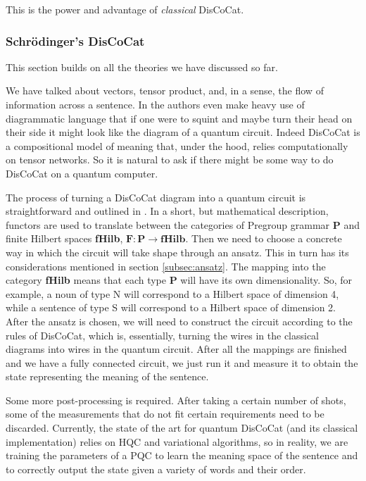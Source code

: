 This is the power and advantage of \textit{classical} DisCoCat.

\subsubsection{Schr{\"o}dinger's DisCoCat}
This section builds on all the theories we have discussed so far.

We have talked about vectors, tensor product, and, in a sense, the flow of information across a sentence. In \cite{coecke_mathematical_2010} the authors even make heavy use of diagrammatic language that if one were to squint and maybe turn their head on their side it might look like the diagram of a quantum circuit. Indeed DisCoCat is a compositional model of meaning that, under the hood, relies computationally on tensor networks. So it is natural to ask if there might be some way to do DisCoCat on a quantum computer.

The process of turning a DisCoCat diagram into a quantum circuit is straightforward and outlined in \cite{lorenz_qnlp_2023,meichanetzidis_quantum_2021}. In a short, but mathematical description, functors are used to translate between the categories of Pregroup grammar \textbf{P} and finite Hilbert spaces \textbf{fHilb}, $\mathbf{F}:\mathbf{P}\rightarrow\mathbf{fHilb}$. Then we need to choose a concrete way in which the circuit will take shape through an ansatz. This in turn has its considerations mentioned in section \ref{subsec:ansatz}. The mapping into the category \textbf{fHilb} means that each type \textbf{P} will have its own dimensionality. So, for example, a noun of type N will correspond to a Hilbert space of dimension 4, while a sentence of type S will correspond to a Hilbert space of dimension 2. After the ansatz is chosen, we will need to construct the circuit according to the rules of DisCoCat, which is, essentially, turning the wires in the classical diagrams into wires in the quantum circuit. After all the mappings are finished and we have a fully connected circuit, we just run it and measure it to obtain the state representing the meaning of the sentence.

Some more post-processing is required. After taking a certain number of shots, some of the measurements that do not fit certain requirements need to be discarded. Currently, the state of the art for quantum DisCoCat (and its classical implementation) relies on HQC and variational algorithms, so in reality, we are training the parameters of a PQC to learn the meaning space of the sentence and to correctly output the state given a variety of words and their order.

